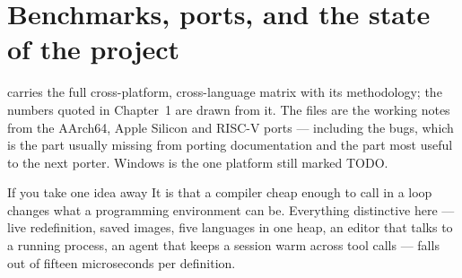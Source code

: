 \section{Benchmarks, ports, and the state of the project}

 carries the full cross-platform, cross-language matrix
with its methodology; the numbers quoted in Chapter~1 are drawn from it. The
 files are the working notes from the AArch64, Apple
Silicon and RISC-V ports --- including the bugs, which is the part usually
missing from porting documentation and the part most useful to the next
porter. Windows is the one platform still marked TODO.

\begin{callout}{If you take one idea away}
It is that a compiler cheap enough to call in a loop changes what a
programming environment can be. Everything distinctive here --- live
redefinition, saved images, five languages in one heap, an editor that talks
to a running process, an agent that keeps a session warm across tool calls
--- falls out of fifteen microseconds per definition.
\end{callout}
